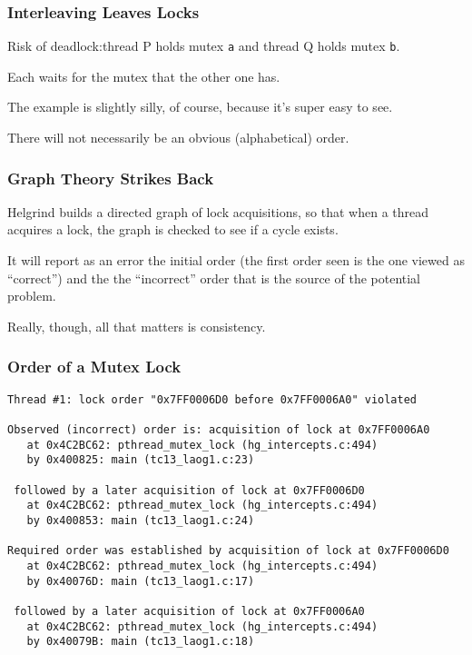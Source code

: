 \begin{frame}
\frametitle{Interleaving Leaves Locks}

Risk of deadlock:thread P holds mutex \texttt{a} and thread Q holds mutex \texttt{b}. 

Each waits for the mutex that the other one has. 

The example is slightly silly, of course, because it's super easy to see. 

There will not necessarily be an obvious (alphabetical) order.

\end{frame}

\begin{frame}
\frametitle{Graph Theory Strikes Back}


Helgrind builds a directed graph of lock acquisitions, so that when a thread acquires a lock, the graph is checked to see if a cycle exists. 

  It will report as an error the initial order (the first order seen is the one viewed as ``correct'') and the the ``incorrect'' order that is the source of the potential problem. 
  
  Really, though, all that matters is consistency.

\end{frame}

\begin{frame}[fragile]
\frametitle{Order of a Mutex Lock}
{\scriptsize
\begin{verbatim}
Thread #1: lock order "0x7FF0006D0 before 0x7FF0006A0" violated

Observed (incorrect) order is: acquisition of lock at 0x7FF0006A0
   at 0x4C2BC62: pthread_mutex_lock (hg_intercepts.c:494)
   by 0x400825: main (tc13_laog1.c:23)

 followed by a later acquisition of lock at 0x7FF0006D0
   at 0x4C2BC62: pthread_mutex_lock (hg_intercepts.c:494)
   by 0x400853: main (tc13_laog1.c:24)

Required order was established by acquisition of lock at 0x7FF0006D0
   at 0x4C2BC62: pthread_mutex_lock (hg_intercepts.c:494)
   by 0x40076D: main (tc13_laog1.c:17)

 followed by a later acquisition of lock at 0x7FF0006A0
   at 0x4C2BC62: pthread_mutex_lock (hg_intercepts.c:494)
   by 0x40079B: main (tc13_laog1.c:18)
\end{verbatim}
}

\end{frame}

